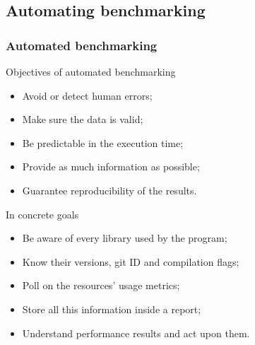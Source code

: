 \documentclass[11pt,english,compress]{beamer}
\begin{document}
\subsection{Automating benchmarking}

\begin{frame}
	\frametitle{Automated benchmarking}

	\begin{block}{Objectives of automated benchmarking}
		\begin{itemize}
			\item Avoid or detect human errors;\pause
			\item Make sure the data is valid;\pause
			\item Be predictable in the execution time;\pause
			\item Provide as much information as possible;\pause
			\item Guarantee reproducibility of the results.
		\end{itemize}
	\end{block}
	
	\pause
	
	\begin{block}{In concrete goals}
		\begin{itemize}
			\item Be aware of every library used by the program;\pause
			\item Know their versions, git ID and compilation flags;\pause
			\item Poll on the resources' usage metrics; \pause
			\item Store all this information inside a report\pause;
			\item Understand performance results and act upon them.
		\end{itemize}
	\end{block}
\end{frame}
\end{document}
